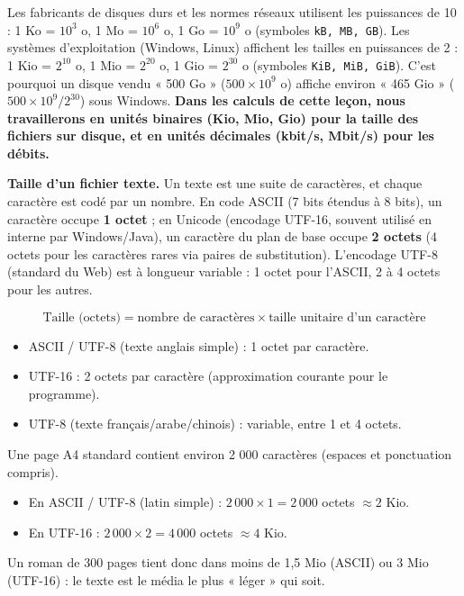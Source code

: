 \documentclass[11pt]{article}
\newcommand{\cle}[1]{{\popxbold\color{popdark}#1}}
\begin{document}
\begin{attention}
Les fabricants de disques durs et les normes réseaux utilisent les puissances de 10 : 1 Ko = $10^3$ o, 1 Mo = $10^6$ o, 1 Go = $10^9$ o (symboles \texttt{kB, MB, GB}). Les systèmes d'exploitation (Windows, Linux) affichent les tailles en puissances de 2 : 1 Kio = $2^{10}$ o, 1 Mio = $2^{20}$ o, 1 Gio = $2^{30}$ o (symboles \texttt{KiB, MiB, GiB}). C'est pourquoi un disque vendu « 500 Go » ($500 \times 10^9$ o) affiche environ « 465 Gio » ($500 \times 10^9 / 2^{30}$) sous Windows. \textbf{Dans les calculs de cette leçon, nous travaillerons en unités binaires (Kio, Mio, Gio) pour la taille des fichiers sur disque, et en unités décimales (kbit/s, Mbit/s) pour les débits.}
\end{attention}

\textbf{Taille d'un fichier texte.} Un texte est une suite de caractères, et chaque caractère est codé par un nombre. En code \cle{ASCII} (7 bits étendus à 8 bits), un caractère occupe \textbf{1 octet} ; en \cle{Unicode} (encodage UTF-16, souvent utilisé en interne par Windows/Java), un caractère du plan de base occupe \textbf{2 octets} (4 octets pour les caractères rares via paires de substitution). L'encodage \cle{UTF-8} (standard du Web) est à longueur variable : 1 octet pour l'ASCII, 2 à 4 octets pour les autres.

\begin{propriete}
\[
\text{Taille (octets)} = \text{nombre de caractères} \times \text{taille unitaire d'un caractère}
\]
\begin{itemize}
  \item ASCII / UTF-8 (texte anglais simple) : 1 octet par caractère.
  \item UTF-16 : 2 octets par caractère (approximation courante pour le programme).
  \item UTF-8 (texte français/arabe/chinois) : variable, entre 1 et 4 octets.
\end{itemize}
\end{propriete}

\begin{exemplebox}
Une page A4 standard contient environ 2 000 caractères (espaces et ponctuation compris).
\begin{itemize}
  \item En ASCII / UTF-8 (latin simple) : $2\,000 \times 1 = 2\,000$ octets $\approx 2$ Kio.
  \item En UTF-16 : $2\,000 \times 2 = 4\,000$ octets $\approx 4$ Kio.
\end{itemize}
Un roman de 300 pages tient donc dans moins de 1,5 Mio (ASCII) ou 3 Mio (UTF-16) : le texte est le média le plus « léger » qui soit.
\end{exemplebox}
\end{document}
